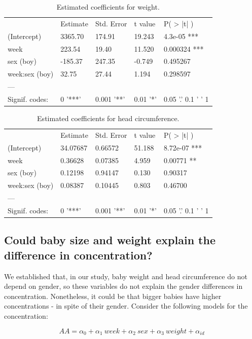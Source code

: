 \documentclass[12pt]{article}
\begin{document}
\begin{table}[!htb]
\begin{tabular}{lllll}
 & Estimate & Std. Error & t value & P\left( > |t| \right) \\
(Intercept) & 3365.70 & 174.91 & 19.243 & 4.3e-05 *** \\
week & 223.54 & 19.40 & 11.520 & 0.000324 *** \\
sex (boy) & -185.37 & 247.35 & -0.749 & 0.495267 \\
week:sex (boy) & 32.75 & 27.44 & 1.194 & 0.298597 \\
--- &  &  &  &  \\
Signif. codes: & 0 '***' & 0.001 '**' & 0.01 '*' & 0.05 '.' 0.1 ' ' 1
\end{tabular}
\caption{Estimated coefficients for weight.}
\label{tab:weight}
\end{table}

\begin{table}[!htb]
\begin{tabular}{lllll}
 & Estimate & Std. Error & t value & P\left( > |t| \right)\\
(Intercept) & 34.07687 & 0.66572 & 51.188 & 8.72e-07 *** \\
week & 0.36628 & 0.07385 & 4.959 & 0.00771 ** \\
sex (boy) & 0.12198 & 0.94147 & 0.130 & 0.90317 \\
week:sex (boy) & 0.08387 & 0.10445 & 0.803 & 0.46700 \\
--- &  &  &  &  \\
Signif. codes: & 0 '***' & 0.001 '**' & 0.01 '*' & 0.05 '.' 0.1 ' ' 1
\end{tabular}
\caption{Estimated coefficients for head circumference.}
\label{tab:head_c}
\end{table}

\clearpage

\subsection{Could baby size and weight explain the difference in concentration?}

We established that, in our study, baby weight and head circumference do not depend on gender, so these variables do not explain the gender differences in concentration. Nonetheless, it could be that bigger babies have higher concentrations - in spite of their gender. Consider the following models for the concentration:

\begin{equation} \label{eq:model4}
  AA = \alpha_0 + \alpha_1 \ week + \alpha_2 \ sex + \alpha_3 \ weight + \alpha_{id}
\end{equation}
\end{document}
